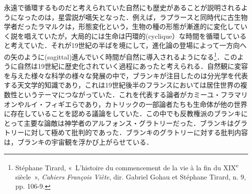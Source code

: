 永遠で循環するものだと考えられていた自然にも歴史があることが説明されるようになったのは，星雲説が嚆矢となった．例えば，ラプラースと同時代に古生物学者だったラマルクは，形態変化という，生物の種の形態が漸進的に変化していく説を唱えていたが，大局的には生命は円環的(cyclique）な時間を循環していると考えていた．それが19世紀の半ばを境にして，進化論の登場によって一方向への矢のように(sagittal)進んでいく時間が自然に導入されるようになる\footnote{Stéphane Tirard, «~L’histoire du commencement de la vie à la fin du XIX\textsuperscript{e} siècle~», \emph{Cahiers François Viète}, dir. Gabriel Gohau et Stéphane Tirard, n. 9, pp. 106-9. }．このように自然は19世紀に歴史化されていく過程にあったと考えられる．自然観に変容を与えた様々な科学の様々な発展の中で，ブランキが注目したのは分光学を代表する天文学的知識であり，これは19世紀後半のフランスにおいては居住世界の複数性というテーマにつながっていた．これを代表する論者がカミーユ・フラマリオンやルイ・フィギエらであり，カトリックの一部論者たちも生命体が他の世界に存在していることを認める議論をしていた．この中でも反教権派のブランキにとって主要な論敵は神学者のアルフォンス・グラトリーだった．ブランキはグラトリーに対して極めて批判的であった．ブランキのグラトリーに対する批判内容は，ブランキの宇宙観を浮かび上がらせている．

